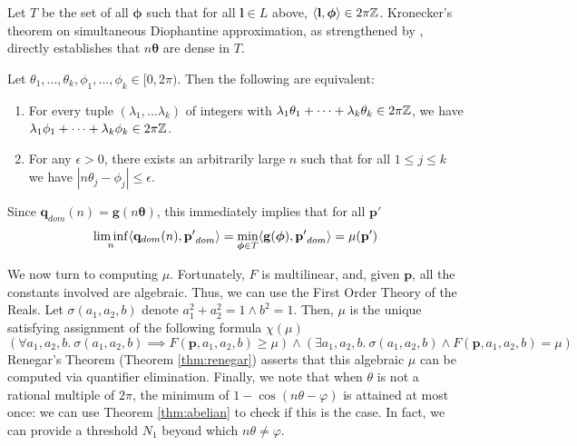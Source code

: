 Let $T$ be the set of all $\boldsymbol\phi$ such that for all $\mathbf{l} \in L$ above, $\langle\mathbf{l}, \boldsymbol\phi\rangle \in 2\pi\mathbb{Z}$. Kronecker's theorem on simultaneous Diophantine approximation, as strengthened by \cite{joeljames3, ouaknine2014positivity}, directly establishes that $n\boldsymbol\theta$ are dense in $T$.
 
 \begin{theorem}
  \label{thm:kronecker}
  Let $\theta_1, ... , \theta_k, \phi_1, ... , \phi_k \in [0, 2\pi)$. Then the following are equivalent:
  \begin{enumerate}
\item For every tuple $(\lambda_1,...\lambda_k)$ of integers with 
    $\lambda_1 \theta_1 + \cdots +  \lambda_k \theta_k \in 2\pi\mathbb{Z}$, 
  we have \\$\lambda_1 \phi_1 + \cdots + \lambda_k \phi_k \in 2\pi\mathbb{Z}$.
  \item For any $\epsilon > 0$, there exists an arbitrarily large $n$ such that for all 
    $1 \le j \le k$ we have $| n \theta_j - \phi_j| \le \epsilon$.
    \end{enumerate}
  \end{theorem}
  
Since $\mathbf{q}_{dom}(n) = \mathbf{g}(n\boldsymbol{\theta})$, this immediately implies that for all $\mathbf{p'}$
\begin{equation}
\liminf_n  \langle\mathbf{q}_{dom}(n), \mathbf{p'}_{dom}\rangle = \min_{\boldsymbol{\phi} \in T} \langle\mathbf{g}(\boldsymbol{\phi}), \mathbf{p'}_{dom}\rangle  = \mu(\mathbf{p'})
\end{equation}

We now turn to computing $\mu$. Fortunately, $F$ is multilinear, and, given $\mathbf{p}$, all the constants involved are algebraic. Thus, we can use the First Order Theory of the Reals. Let $\sigma(a_1, a_2, b)$ denote $a_1^2 + a_2^2 = 1 \land b^2 =1$. Then, $\mu$ is the unique satisfying assignment of the following formula $\chi(\mu)$
$$
(\forall a_1, a_2, b.~ \sigma(a_1, a_2, b) \implies F(\mathbf{p}, a_1, a_2, b) \ge \mu) \land (\exists a_1, a_2, b.~ \sigma(a_1, a_2, b) \land F(\mathbf{p}, a_1, a_2, b) = \mu)
$$
Renegar's Theorem (Theorem \ref{thm:renegar}) asserts that this algebraic $\mu$ can be computed via quantifier elimination. Finally, we note that when $\theta$ is not a rational multiple of $2\pi$, the minimum of $1 - \cos(n\theta - \varphi)$ is attained at most once: we can use Theorem \ref{thm:abelian} to check if this is the case. In fact, we can provide a threshold $N_1$ beyond which $n\theta \ne \varphi$. 



